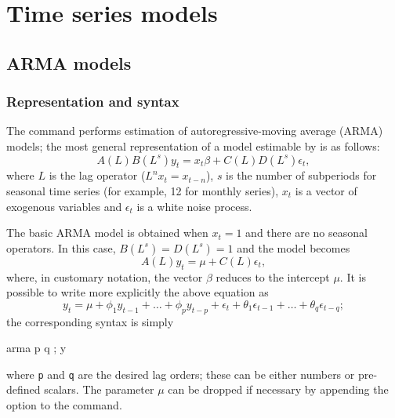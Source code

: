 \chapter{Time series models}
\label{chap:timeser}

\section{ARMA models}
\label{arma-estimation}

\subsection{Representation and syntax}
\label{arma-repr}

The  command performs estimation of autoregressive-moving
average (ARMA) models; the most general representation of a model
estimable by  is as follows:
\begin{equation}
  \label{eq:general-arma}
  A(L) B(L^s) y_t = x_t \beta + C(L) D(L^s) \epsilon_t ,
\end{equation}
where $L$ is the lag operator ($L^n x_t = x_{t-n}$), $s$ is the
number of subperiods for seasonal time series (for example, 12 for
monthly series), $x_t$ is a vector of exogenous variables and
$\epsilon_t$ is a white noise process.

The basic ARMA model is obtained when $x_t = 1$ and there are no
seasonal operators. In this case, $B(L^s) = D(L^s) = 1$ and the model
becomes
\begin{equation}
  \label{eq:plain-arma}
  A(L) y_t = \mu + C(L) \epsilon_t ,
\end{equation}
where, in customary notation, the vector $\beta$ reduces to the
intercept $\mu$. It is possible to write more explicitly the above
equation as
\[
  y_t = \mu + \phi_1 y_{t-1} + \ldots + \phi_p y_{t-p} + 
  \epsilon_t + \theta_1 \epsilon_{t-1} + \ldots + \theta_q
  \epsilon_{t-q} ;
\]
the corresponding  syntax is simply
\begin{code}
  arma p q ; y
\end{code}
where \verb|p| and \verb|q| are the desired lag orders; these can be
either numbers or pre-defined scalars. The parameter $\mu$ can be
dropped if necessary by appending the option  to the command.


